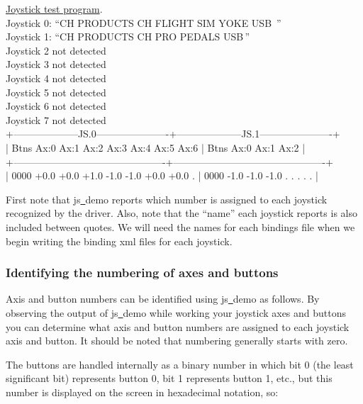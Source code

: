 \begin{ttfamily}
\tiny
\noindent
\underline{Joystick test program}.\\
Joystick 0: ``CH PRODUCTS CH FLIGHT SIM YOKE USB\, ''\\
Joystick 1: ``CH PRODUCTS CH PRO PEDALS USB\,''\\
Joystick 2 not detected\\
Joystick 3 not detected\\
Joystick 4 not detected\\
Joystick 5 not detected\\
Joystick 6 not detected\\
Joystick 7 not detected\\
+--------------------JS.0----------------------+--------------------JS.1----------------------+\\
| Btns Ax:0 Ax:1 Ax:2 Ax:3 Ax:4 Ax:5 Ax:6      | Btns Ax:0 Ax:1 Ax:2                          |\\
+----------------------------------------------+----------------------------------------------+\\
| 0000 +0.0 +0.0 +1.0 -1.0 -1.0 +0.0 +0.0   .  | 0000 -1.0 -1.0 -1.0   .    .    .    .    .  |\\
\end{ttfamily}

\noindent
First note that js\underline{~}demo reports which number is assigned to each joystick recognized by the driver.  Also, note that the ``name'' each joystick reports is also included between quotes.  We will need the names for each bindings file when we begin writing the binding xml files for each joystick.

\subsubsection{Identifying the numbering of axes and buttons\label{identifying}}
Axis and button numbers can be identified using js\underline{~}demo as follows. By observing the output of js\underline{~}demo while working your joystick axes and buttons you can determine what axis and button numbers are assigned to each joystick axis and button. It should be noted that numbering generally starts with zero. 

The buttons are handled internally as a binary number in which bit 0 (the least significant bit) represents button 0, bit 1 represents button 1, etc., but this number is displayed on the screen in hexadecimal notation, so:
\medskip

